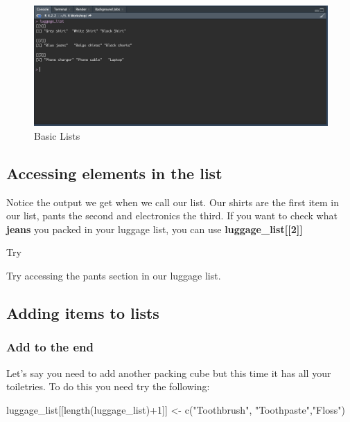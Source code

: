 \documentclass[
]{book}
\newenvironment{Shaded}{\begin{snugshade}}{\end{snugshade}}
\newcommand{\DecValTok}[1]{\textcolor[rgb]{0.00,0.00,0.81}{#1}}
\newcommand{\FunctionTok}[1]{\textcolor[rgb]{0.00,0.00,0.00}{#1}}
\newcommand{\NormalTok}[1]{#1}
\newcommand{\OtherTok}[1]{\textcolor[rgb]{0.56,0.35,0.01}{#1}}
\newcommand{\SpecialCharTok}[1]{\textcolor[rgb]{0.00,0.00,0.00}{#1}}
\newcommand{\StringTok}[1]{\textcolor[rgb]{0.31,0.60,0.02}{#1}}
\begin{document}
\begin{figure}
\includegraphics[width=29.36in]{images/3.6listconsole} \caption{Basic Lists}\label{fig:unnamed-chunk-19}
\end{figure}

\hypertarget{accessing-elements-in-the-list}{%
\subsection{Accessing elements in the list}\label{accessing-elements-in-the-list}}

Notice the output we get when we call our list. Our shirts are the first item in our list, pants the second and electronics the third. If you want to check what \textbf{jeans} you packed in your luggage list, you can use \textbf{luggage\_list{[}{[}2{]}{]}}

Try

Try accessing the pants section in our luggage list.

\hypertarget{adding-items-to-lists}{%
\subsection{Adding items to lists}\label{adding-items-to-lists}}

\hypertarget{add-to-the-end}{%
\subsubsection{Add to the end}\label{add-to-the-end}}

Let's say you need to add another packing cube but this time it has all your toiletries. To do this you need try the following:

\begin{Shaded}
\begin{Highlighting}[]
\NormalTok{luggage\_list[[}\FunctionTok{length}\NormalTok{(luggage\_list)}\SpecialCharTok{+}\DecValTok{1}\NormalTok{]] }\OtherTok{\textless{}{-}} \FunctionTok{c}\NormalTok{(}\StringTok{"Toothbrush"}\NormalTok{, }\StringTok{"Toothpaste"}\NormalTok{,}\StringTok{"Floss"}\NormalTok{)}
\end{Highlighting}
\end{Shaded}
\end{document}
